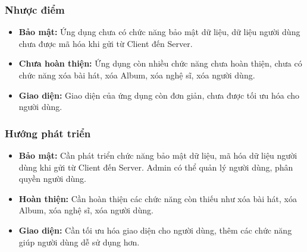\documentclass[a4paper]{article}
\begin{document}
\begin{flushleft}
	\subsubsection{Nhược điểm}
	\begin{itemize}
		\item \textbf{Bảo mật:} Ứng dụng chưa có chức năng bảo mật dữ liệu, dữ liệu người dùng chưa được mã hóa khi gửi từ Client đến Server.
		\item \textbf{Chưa hoàn thiện:} Ứng dụng còn nhiều chức năng chưa hoàn thiện, chưa có chức năng xóa bài hát, xóa Album, xóa nghệ sĩ, xóa người dùng.
		\item \textbf{Giao diện:} Giao diện của ứng dụng còn đơn giản, chưa được tối ưu hóa cho người dùng.
	\end{itemize}

	\subsubsection{Hướng phát triển}
	\begin{itemize}
		\item \textbf{Bảo mật:} Cần phát triển chức năng bảo mật dữ liệu, mã hóa dữ liệu người dùng khi gửi từ Client đến Server. Admin có thể quản lý người dùng, phân quyền người dùng.
		\item \textbf{Hoàn thiện:} Cần hoàn thiện các chức năng còn thiếu như xóa bài hát, xóa Album, xóa nghệ sĩ, xóa người dùng.
		\item \textbf{Giao diện:} Cần tối ưu hóa giao diện cho người dùng, thêm các chức năng giúp người dùng dễ sử dụng hơn.
	\end{itemize}
\end{flushleft}


\end{document}
